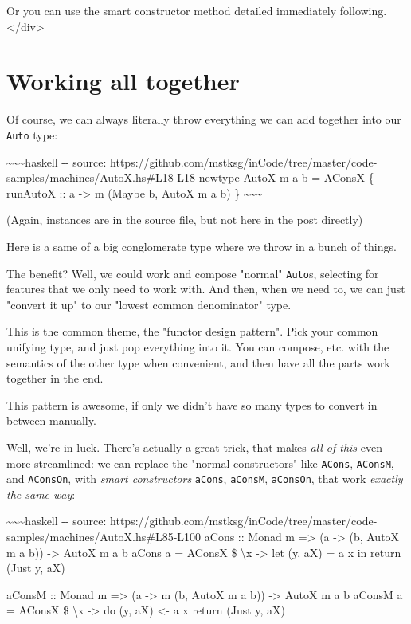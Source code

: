 \documentclass[]{article}
\begin{document}
Or you can use the smart constructor method detailed immediately following.
\textless{}/div\textgreater{}

\section{Working all together}

Of course, we can always literally throw everything we can add together into our
\texttt{Auto} type:

\textasciitilde{}\textasciitilde{}\textasciitilde{}haskell -\/- source:
https://github.com/mstksg/inCode/tree/master/code-samples/machines/AutoX.hs\#L18-L18
newtype AutoX m a b = AConsX \{ runAutoX :: a -\textgreater{} m (Maybe b, AutoX
m a b) \} \textasciitilde{}\textasciitilde{}\textasciitilde{}

(Again, instances are in the source file, but not here in the post directly)

Here is a same of a big conglomerate type where we throw in a bunch of things.

The benefit? Well, we could work and compose "normal" \texttt{Auto}s, selecting
for features that we only need to work with. And then, when we need to, we can
just "convert it up" to our "lowest common denominator" type.

This is the common theme, the "functor design pattern". Pick your common
unifying type, and just pop everything into it. You can compose, etc. with the
semantics of the other type when convenient, and then have all the parts work
together in the end.

This pattern is awesome, if only we didn't have so many types to convert in
between manually.

Well, we're in luck. There's actually a great trick, that makes \emph{all of
this} even more streamlined: we can replace the "normal constructors" like
\texttt{ACons}, \texttt{AConsM}, and \texttt{AConsOn}, with \emph{smart
constructors} \texttt{aCons}, \texttt{aConsM}, \texttt{aConsOn}, that work
\emph{exactly the same way}:

\textasciitilde{}\textasciitilde{}\textasciitilde{}haskell -\/- source:
https://github.com/mstksg/inCode/tree/master/code-samples/machines/AutoX.hs\#L85-L100
aCons :: Monad m =\textgreater{} (a -\textgreater{} (b, AutoX m a b))
-\textgreater{} AutoX m a b aCons a = AConsX \$ \textbackslash{}x
-\textgreater{} let (y, aX) = a x in return (Just y, aX)

aConsM :: Monad m =\textgreater{} (a -\textgreater{} m (b, AutoX m a b))
-\textgreater{} AutoX m a b aConsM a = AConsX \$ \textbackslash{}x
-\textgreater{} do (y, aX) \textless{}- a x return (Just y, aX)
\end{document}
